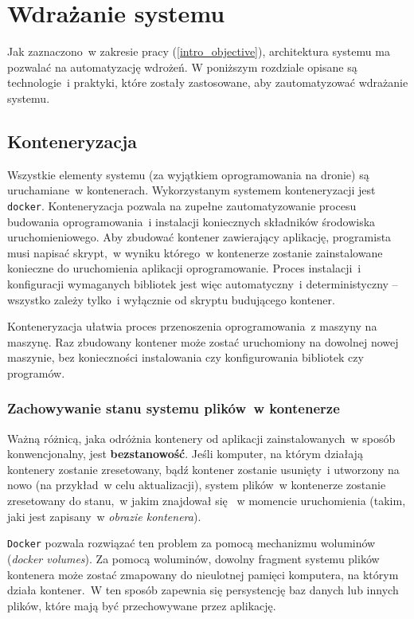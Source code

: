 \chapter{Wdrażanie systemu} \label{chapter_deployment}

Jak zaznaczono~w zakresie pracy (\ref{intro_objective}),
architektura systemu ma pozwalać na automatyzację wdrożeń.
W poniższym rozdziale opisane są technologie~i praktyki, które zostały 
zastosowane, aby zautomatyzować wdrażanie systemu.

\section{Konteneryzacja}

Wszystkie elementy systemu (za wyjątkiem oprogramowania na dronie) są uruchamiane~w kontenerach.
Wykorzystanym systemem konteneryzacji jest \texttt{docker}\cite{docker}.
Konteneryzacja pozwala na zupełne zautomatyzowanie
procesu budowania oprogramowania~i instalacji koniecznych
składników środowiska uruchomieniowego. Aby zbudować kontener zawierający
aplikację, programista musi napisać skrypt,~w wyniku
którego~w kontenerze zostanie zainstalowane konieczne 
do uruchomienia aplikacji oprogramowanie. Proces instalacji~i konfiguracji
wymaganych bibliotek jest więc automatyczny~i deterministyczny -- wszystko
zależy tylko~i wyłącznie od skryptu budującego kontener.

Konteneryzacja ułatwia proces przenoszenia oprogramowania~z maszyny na maszynę. Raz zbudowany
kontener może zostać uruchomiony na dowolnej nowej maszynie, bez konieczności instalowania 
czy konfigurowania bibliotek czy programów. 

\subsection{Zachowywanie stanu systemu plików~w kontenerze} \label{volumes}

Ważną różnicą, jaka odróżnia kontenery od aplikacji zainstalowanych~w sposób konwencjonalny, jest \textbf{bezstanowość}. Jeśli komputer,
na którym działają kontenery zostanie zresetowany, bądź kontener zostanie
usunięty~i utworzony na nowo (na przykład~w celu aktualizacji), system
plików~w kontenerze zostanie zresetowany do stanu,~w jakim znajdował się ~w momencie uruchomienia (takim, jaki jest zapisany~w \textit{obrazie kontenera}).

\texttt{Docker} pozwala rozwiązać ten problem za pomocą mechanizmu 
woluminów (\textit{docker volumes})\cite{docker_volumes}.
Za pomocą woluminów, dowolny fragment systemu
plików kontenera może zostać zmapowany do nieulotnej pamięci komputera, na którym 
działa kontener.~W ten sposób zapewnia się persystencję baz danych lub innych
plików, które mają być przechowywane przez aplikację.\\ %

